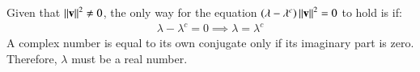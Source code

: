 \documentclass[journal]{IEEEtran}
\newcommand{\conj}[1]{{#1}^c}
\begin{document}
	Given that $\left\lVert\mathbf{v}\right\rVert^2 \neq 0$, the only way for the equation $(\lambda - \conj{\lambda})\norm{\vec{v}}^2 = 0$ to hold is if:
	\begin{align}
		\lambda - \conj{\lambda} = 0 \implies \lambda = \conj{\lambda}
	\end{align}
	A complex number is equal to its own conjugate only if its imaginary part is zero. Therefore, $\lambda$ must be a real number.
	
\end{document}
